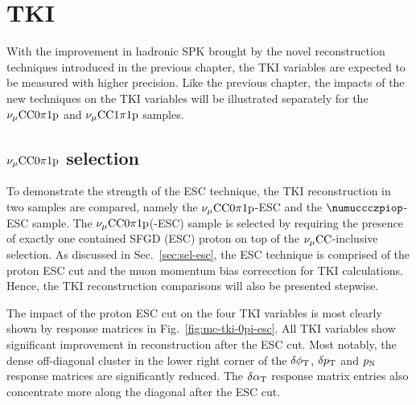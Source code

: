 \section{TKI}
\label{sec:mc-tki}
     With the improvement in hadronic SPK brought by the novel reconstruction techniques introduced in the previous chapter, the TKI variables are expected to be measured with higher precision.
     Like the previous chapter, the impacts of the new techniques on the TKI variables will be illustrated separately for the $\nu_{\mu}\textrm{CC}0\pi1\textrm{p}$ and $\nu_{\mu}\textrm{CC}1\pi1\textrm{p}$ samples.

     \subsection{$\nu_{\mu}\textrm{CC}0\pi1\textrm{p}$ selection}
     \label{sec:mc-tki-0pi}
          To demonstrate the strength of the ESC technique, the TKI reconstruction in two samples are compared, namely the $\nu_{\mu}\textrm{CC}0\pi1\textrm{p}$-ESC and the $\numuccczpiop$-ESC sample.
          The $\nu_{\mu}\textrm{CC}0\pi1\textrm{p}$(-ESC) sample is selected by requiring the presence of exactly one contained SFGD (ESC) proton on top of the $\nu_{\mu}\textrm{CC}$-inclusive selection.
          As discussed in Sec.~\ref{sec:sel-esc}, the ESC technique is comprised of the proton ESC cut and the muon momentum bias correcction for TKI calculations.
          Hence, the TKI reconstruction comparisons will also be presented stepwise.

          The impact of the proton ESC cut on the four TKI variables is most clearly shown by response matrices in Fig.~\ref{fig:mc-tki-0pi-esc}.
          All TKI variables show significant improvement in reconstruction after the ESC cut.
          Most notably, the dense off-diagonal cluster in the lower right corner of the $\delta\phi_\textrm{T}$, $\delta p_\textrm{T}$ and $p_\textrm{N}$ response matrices are significantly reduced.
          The $\delta\alpha_\textrm{T}$ response matrix entries also concentrate more along the diagonal after the ESC cut.
          
